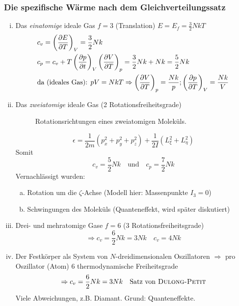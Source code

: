 \subsubsection{Die spezifische Wärme nach dem Gleichverteilungssatz}
\begin{enumerate}[i)]
    \item Das \emph{einatomige} ideale Gas $f=3$ (Translation) $E = E_f = \frac{3}{2} N k T$
    \begin{equation}
        \begin{split}
            & c_v = \left( \frac{\partial E}{\partial T} \right)_{V} = \frac{3}{2} N k \\
            & c_p = c_v + T \left( \frac{\partial p}{\partial t} \right)_{V} \left( \frac{\partial V}{\partial T} \right)_{p} = \frac{3}{2} N k + N k = \frac{5}{2} N k \\
            & \text{da (ideales Gas): } pV = N k T \Rightarrow \left( \frac{\partial V}{\partial T} \right)_{p} = \frac{N k }{p}; \left( \frac{\partial p}{\partial T} \right)_{V} = \frac{N k}{V}
        \end{split}
    \end{equation}
    \item Das \emph{zweiatomige} ideale Gas (2 Rotationsfreiheitsgrade)
    
    \begin{figure}[H]
        \centering
        \def\svgwidth{0.5\textwidth}
        
        \caption{Rotationsrichtungen eines zweiatomigen Moleküls.}
        \label{img:2atomicGasRotationDirections}
    \end{figure}
    
    \begin{equation}
        \epsilon = \frac{1}{2 m} \left( p_x^2 + p_y^2 + p_z^2 \right) + \frac{1}{2 I} \left( L_\xi^2 + L_\eta^2 \right)
    \end{equation}
    Somit
    \begin{equation}
        c_v = \frac{5}{2} N k \quad \text{und} \quad c_p = \frac{7}{2} N k
    \end{equation}
    Vernachlässigt wurden:
    \begin{enumerate}[a)]
        \item Rotation um die $\zeta$-Achse (Modell hier: Massenpunkte $I_3 = 0$)
        \item Schwingungen des Moleküls (Quanteneffekt, wird später diskutiert)
    \end{enumerate}
    \item Drei- und mehratomige Gase $f = 6$ (3 Rotationsfreiheitsgrade)
    \begin{equation}
        \Rightarrow c_v = \frac{6}{2} N k = 3 N k \quad c_v = 4 N k
    \end{equation}
    \item Der Festkörper als System von $N$-dreidimensionalen Oszillatoren $\Rightarrow$ pro Oszillator (Atom) 6 thermodynamische Freiheitsgrade
    \begin{equation}
        \Rightarrow c_v = \frac{6}{2} N k = 3 N k \quad \text{Satz von \textsc{Dulong-Petit}}
    \end{equation}
    Viele Abweichungen, z.B. Diamant. Grund: Quanteneffekte.
\end{enumerate}
